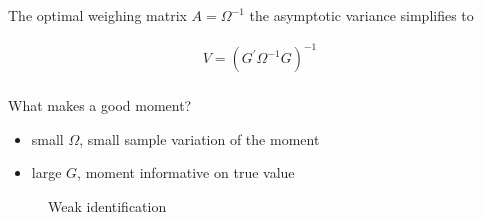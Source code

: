 \begin{frame}

The optimal weighing matrix $A = \Omega^{-1}$ the asymptotic variance simplifies to

\begin{align*}
V = (G^\prime  \Omega^{-1} G)^{-1}\\
\end{align*}

What makes a good moment?\\
\begin{itemize}\setlength\itemsep{1em}
\item small $\Omega$, small sample variation of the moment
\item large $G$, moment informative on true value
\end{itemize}


\end{frame}
\begin{frame}

\begin{figure}[htp]\centering
\caption{Weak identification}
\end{figure}
\end{frame}
